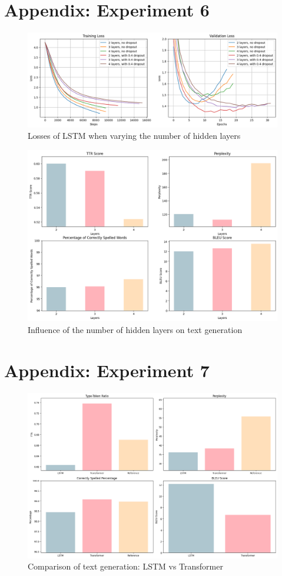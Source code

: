 \documentclass{article}
\begin{document}
\section*{Appendix: Experiment 6}
\begin{figure}[H]
    \centering
    \includegraphics[width=\linewidth]{figures/LSTM_nb_layers.png}
    \caption{Losses of LSTM when varying the number of hidden layers}
    \label{fig:loss_nb_layers}
\end{figure}

\begin{figure}[H]
    \centering
    \includegraphics[width=0.8\linewidth]{figures/text_nb_layers.png}
    \caption{Influence of the number of hidden layers on text generation}
    \label{fig:text_nb_layers}
\end{figure}

\section*{Appendix: Experiment 7}

\begin{figure}[H]
    \centering
    \includegraphics[width=0.8\linewidth]{figures/text_transformers.png}
    \caption{Comparison of text generation: LSTM vs Transformer}
    \label{fig:text_transformer}
\end{figure}
\end{document}
